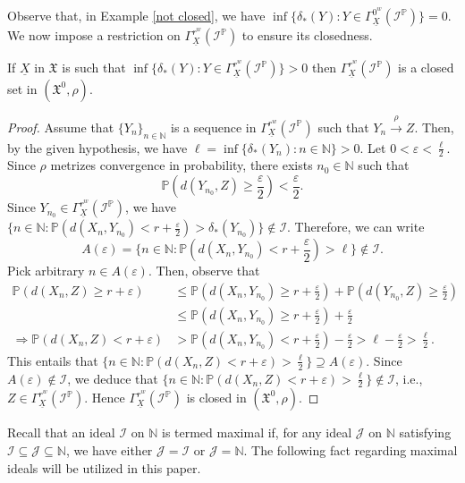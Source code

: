 \documentclass[reqno]{amsart}
\begin{document}
Observe that, in Example \ref {not closed}, we have $\inf\{\delta_{*}(Y):Y\in\Gamma^{0^w}_{\underline{X}}(\mathcal{I}^{\mathbb{P}})\}=0$. We now impose a restriction on $\Gamma^{r^w}_{\underline{X}}(\mathcal{I}^{\mathbb{P}})$ to ensure its closedness.
\begin{proposition}\label{weakclosed}
If $\underline{X}$ in $\mathfrak{X}$ is such that $\inf\{\delta_{*}(Y):Y\in \Gamma^{r^w}_{\underline{X}}(\mathcal{I}^{\mathbb{P}})\}>0$ then $\Gamma^{r^w}_{\underline{X}}(\mathcal{I}^{\mathbb{P}})$ is a closed set in $(\mathfrak{X^0},\rho)$.
\end{proposition}
\begin{proof}
Assume that $\{Y_n\}_{n\in\mathbb{N}}$ is a sequence in $\Gamma^{r^w}_{\underline{X}}(\mathcal{I}^{\mathbb{P}})$ such that $Y_n\xrightarrow{\rho} Z$. Then, by the given hypothesis, we have $\ell=\inf\{\delta_{*}(Y_n):n\in\mathbb{N}\}>0$. Let $0<\varepsilon<\frac{\ell}{2}$. Since $\rho$ metrizes convergence in probability, there exists $n_0\in\mathbb{N}$ such that
$$
\mathbb{P}(d(Y_{n_0},Z)\geq\frac{\varepsilon}{2})<\frac{\varepsilon}{2}.
$$
Since $Y_{n_0}\in\Gamma^{r^w}_{\underline{X}}(\mathcal{I}^{\mathbb{P}})$, we have
$
\{n\in\mathbb{N}:\mathbb{P}(d(X_n,Y_{n_0})<r+\frac{\varepsilon}{2})>\delta_{*}(Y_{n_0})\}\notin\mathcal{I}$. Therefore, we can write
$$
A(\varepsilon)=\{n\in\mathbb{N}:\mathbb{P}(d(X_n,Y_{n_0})<r+\frac{\varepsilon}{2})>\ell\}\notin\mathcal{I}.
$$
Pick arbitrary $n\in A(\varepsilon)$. Then, observe that
\begin{align*}
	\mathbb{P}(d(X_n,Z)\geq r+\varepsilon)&\leq  \mathbb{P}(d(X_n,Y_{n_0})\geq r+\frac{\varepsilon}{2})+	\mathbb{P}(d(Y_{n_0},Z)\geq \frac{\varepsilon}{2})\\
	&\leq \mathbb{P}(d(X_n,Y_{n_0})\geq r+\frac{\varepsilon}{2})+\frac{\varepsilon}{2}\\
	\Rightarrow 	\mathbb{P}(d(X_n,Z)<r+\varepsilon)&>\mathbb{P}(d(X_n,Y_{n_0})<r+\frac{\varepsilon}{2})-\frac{\varepsilon}{2}>\ell-\frac{\varepsilon}{2}>\frac{\ell}{2}.
\end{align*}
This entails that  $\{n\in\mathbb{N}:\mathbb{P}(d(X_n,Z)<r+\varepsilon)>\frac{\ell}{2}\}\supseteq A(\varepsilon)$. Since $A(\varepsilon)\notin\mathcal{I}$, we deduce that $\{n\in\mathbb{N}:\mathbb{P}(d(X_n,Z)<r+\varepsilon)>\frac{\ell}{2}\}\notin\mathcal{I}$, i.e., $Z\in\Gamma^{r^w}_{\underline{X}}(\mathcal{I}^{\mathbb{P}})$. Hence $\Gamma^{r^w}_{\underline{X}}(\mathcal{I}^{\mathbb{P}})$ is closed in $(\mathfrak{X^0},\rho)$.
\end{proof}
	Recall that an ideal $\mathcal{I}$ on $\mathbb{N}$ is termed maximal if, for any ideal $\mathcal{J}$ on $\mathbb{N}$ satisfying $\mathcal{I} \subseteq \mathcal{J} \subseteq \mathbb{N}$, we have either \( \mathcal{J} = \mathcal{I} \) or $ \mathcal{J} = \mathbb{N}$. The following fact regarding maximal ideals will be utilized in this paper.
\end{document}
